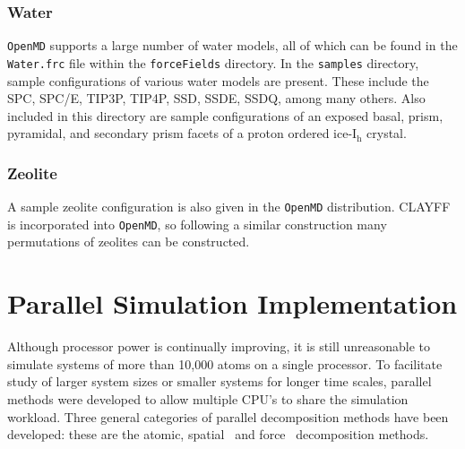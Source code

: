 \documentclass[]{book}
\begin{document}
\subsection{Water}
{\tt OpenMD} supports a large number of water models, all of which can
be found in the {\tt Water.frc} file within the {\tt forceFields}
directory. In the {\tt samples} directory, sample configurations of
various water models are present. These include the SPC, SPC/E, TIP3P,
TIP4P, SSD, SSDE, SSDQ, among many others. Also included in this
directory are sample configurations of an exposed basal, prism,
pyramidal, and secondary prism facets of a proton ordered
ice-I$_\mathrm{h}$ crystal.

\subsection{Zeolite}
A sample zeolite configuration is also given in the {\tt OpenMD}
distribution. CLAYFF is incorporated into {\tt OpenMD}, so following a
similar construction many permutations of zeolites can be constructed.


\chapter{\label{section:parallelization} Parallel Simulation Implementation}

Although processor power is continually improving, it is still
unreasonable to simulate systems of more than 10,000 atoms on a single
processor. To facilitate study of larger system sizes or smaller
systems for longer time scales, parallel methods were developed to
allow multiple CPU's to share the simulation workload. Three general
categories of parallel decomposition methods have been developed:
these are the atomic,\cite{Fox88} spatial~\cite{plimpton95} and
force~\cite{Paradyn} decomposition methods.
\end{document}
